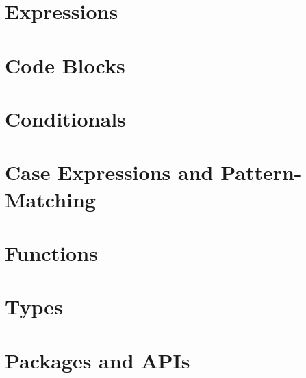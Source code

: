 \section{Expressions}

\cutend*

\section{Code Blocks}

\cutend*

\section{Conditionals}

\cutend*


\section{Case Expressions and Pattern-Matching}

\cutend*

\section{Functions}

\cutend*

\section{Types}

\cutend*

\section{Packages and APIs}

\cutend*



